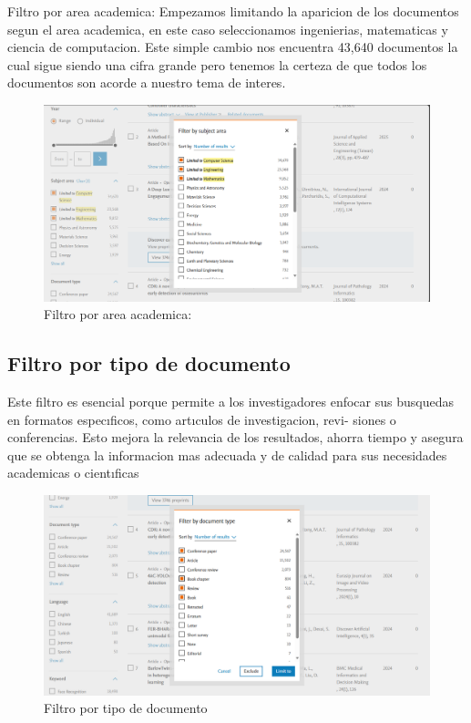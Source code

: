 \documentclass[conference]{IEEEtran}
\begin{document}
 Filtro por area academica: Empezamos limitando
la aparicion de los documentos segun el area academica, en
este caso seleccionamos ingenierias, matematicas y ciencia
de computacion. Este simple cambio nos encuentra 43,640
documentos la cual sigue siendo una cifra grande pero tenemos
la certeza de que todos los documentos son acorde a nuestro
tema de interes.
\begin{figure}[H]
    \centering
    \includegraphics[width=1\linewidth]{1.png}
    \caption{Filtro por area academica:}
    \label{fig:enter-label}
\end{figure}
\subsection{Filtro por tipo de documento}


 Este filtro es esencial porque permite a los investigadores enfocar sus busquedas 
en formatos especıficos, como artıculos de investigacion, revi-
siones o conferencias. Esto mejora la relevancia de los resultados, ahorra tiempo y asegura que se obtenga la informacion
mas adecuada y de calidad para sus necesidades academicas
o cientıficas
\begin{figure}[H]
    \centering
    \includegraphics[width=1\linewidth]{2.png}
    \caption{Filtro por tipo de documento}
    \label{fig:enter-label}
\end{figure}
\end{document}
